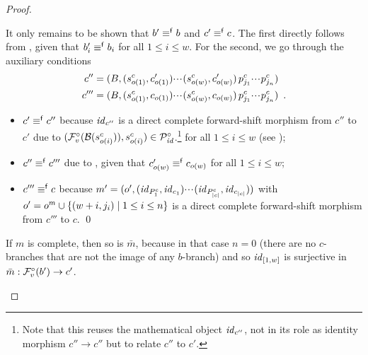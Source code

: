\begin{proof}
\begin{enumerate}[topsep=\smallskipamount]
\smallskip
It only remains to be shown that $b'\equiv^{\mathsf f} b$ and $c'\equiv^{\mathsf f} c$. The first directly follows from , given that $b'_i\equiv^{\mathsf f} b_i$ for all $1\leq i\leq w$. For the second, we go through the auxiliary conditions
\begin{align*}
c''=\;&(B,(s^c_{o(1)},c'_{o(1)}){\cdotp\mkern-2mu\cdotp\mkern-2mu\cdotp\mkern1mu} (s^c_{o(w)},c'_{o(w)})\,p^c_{j_1}{\cdotp\mkern-2mu\cdotp\mkern-2mu\cdotp\mkern1mu} p^c_{j_n}) \\
c'''=\;&(B,(s^c_{o(1)},c_{o(1)}){\cdotp\mkern-2mu\cdotp\mkern-2mu\cdotp\mkern1mu} (s^c_{o(w)},c_{o(w)})\,p^c_{j_1}{\cdotp\mkern-2mu\cdotp\mkern-2mu\cdotp\mkern1mu} p^c_{j_n}) \enspace.
\end{align*}
\begin{itemize}
\item $c'\equiv^{\mathsf f} c''$ because $\mathit{id}_{c''}$ is a direct complete forward-shift morphism from $c''$ to $c'$ due to $(\mathcal{F}^\circ_{v}(\mathcal{B}(s^c_{o(i)})),s^c_{o(i)})\in \mathcal{P}^\circ_{\mathit{id}}$.\footnote{Note that this reuses the mathematical object $\mathit{id}_{c''}$, not in its role as identity morphism $c''\to c''$ but to relate $c''$ to $c'$.}  for all $1\leq i\leq w$ (see );

\item $c''\equiv^{\mathsf f} c'''$ due to , given that $c'_{o(w)}\equiv^{\mathsf f} c_{o(w)}$ for all $1\leq i\leq w$; 

\item $c'''\equiv^{\mathsf f} c$ because $m'=(o',(\mathit{id}_{P^c_1},\mathit{id}_{c_1}){\cdotp\mkern-2mu\cdotp\mkern-2mu\cdotp\mkern1mu} (\mathit{id}_{P^c_{|c|}},\mathit{id}_{c_{|c|}}))$ with $o'=o^m\cup\{{(w+i,j_i) \mid 1\leq i\leq n}\}$ is a direct complete forward-shift morphism from $c'''$ to $c$.
\qed
\end{itemize}
If $m$ is complete, then so is $\bar m$, because in that case $n=0$ (there are no $c$-branches that are not the image of any $b$-branch) and so $\mathit{id}_{[1,w]}$ is surjective in $\bar m:\mathcal{F}^\circ_{v}(b')\rightarrow c'$.
\end{enumerate}
\end{proof}

%
